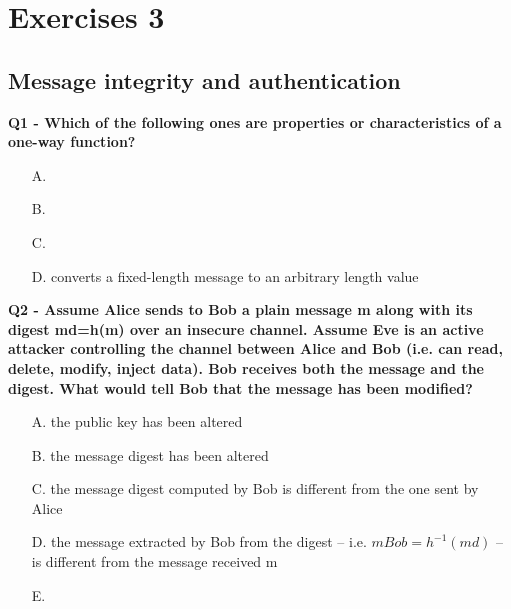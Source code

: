 \chapter{Exercises 3}

\section{Message integrity and authentication}

\textbf{Q1 - Which of the following ones are properties or characteristics of a one-way function?}
\begin{enumerate}
    \item[A.] 
    \item[B.] 
    \item[C.] 
    \item[D.] converts a fixed-length message to an arbitrary length value
\end{enumerate}

\textbf{Q2 - Assume Alice sends to Bob a plain message m along with its digest md=h(m) over an insecure channel. Assume Eve is an active attacker controlling the channel between Alice and Bob (i.e. can read, delete, modify, inject data). Bob receives both the message and the digest. What would tell Bob that the message has been modified?}
\begin{enumerate}
    \item[A.] the public key has been altered
    \item[B.] the message digest has been altered
    \item[C.] the message digest computed by Bob is different from the one sent by Alice
    \item[D.] the message extracted by Bob from the digest – i.e. $mBob=h^{-1}(md)$ – is different from the message received m
    \item[E.] 
\end{enumerate}



